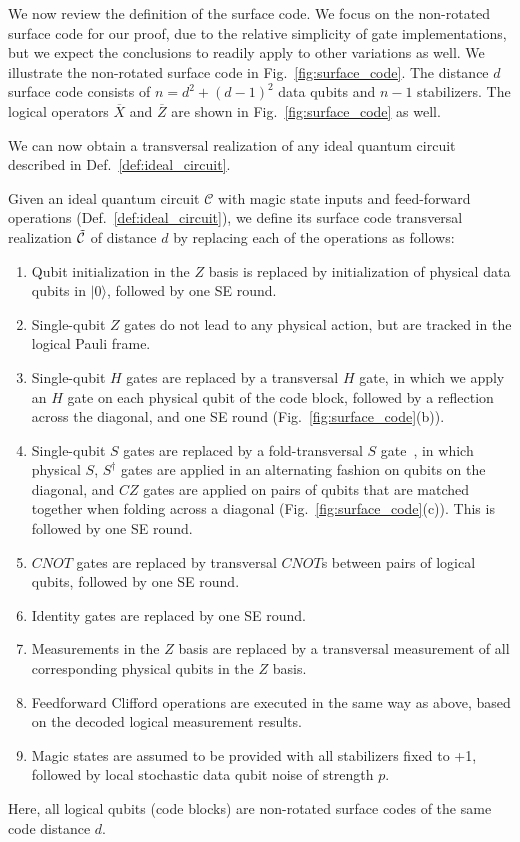 We now review the definition of the surface code.
%
We focus on the non-rotated surface code for our proof, due to the relative simplicity of gate implementations, but we expect the conclusions to readily apply to other variations as well.
%
We illustrate the non-rotated surface code in Fig.~\ref{fig:surface_code}.
%
The distance $d$ surface code consists of $n=d^2+(d-1)^2$ data qubits and $n-1$ stabilizers.
%
The logical operators $\overline{X}$ and $\overline{Z}$ are shown in Fig.~\ref{fig:surface_code} as well.

We can now obtain a transversal realization of any ideal quantum circuit described in Def.~\ref{def:ideal_circuit}.

\begin{definition}
\label{def:surface_code_circuit}
Given an ideal quantum circuit $\mathcal{C}$ with magic state inputs and feed-forward operations (Def.~\ref{def:ideal_circuit}), we define its surface code transversal realization $\tilde{\mathcal{C}}$ of distance $d$ by replacing each of the operations as follows:
\begin{enumerate}
\item Qubit initialization in the $Z$ basis is replaced by initialization of physical data qubits in $|0\rangle$, followed by one SE round.
\item Single-qubit $Z$ gates do not lead to any physical action, but are tracked in the logical Pauli frame.
\item Single-qubit $H$ gates are replaced by a transversal $H$ gate, in which we apply an $H$ gate on each physical qubit of the code block, followed by a reflection across the diagonal, and one SE round (Fig.~\ref{fig:surface_code}(b)).
\item Single-qubit $S$ gates are replaced by a fold-transversal $S$ gate~\cite{kubica2015unfolding,moussa2016transversal}, in which physical $S$, $S^\dagger$ gates are applied in an alternating fashion on qubits on the diagonal, and $CZ$ gates are applied on pairs of qubits that are matched together when folding across a diagonal (Fig.~\ref{fig:surface_code}(c)). This is followed by one SE round.
\item $CNOT$ gates are replaced by transversal $CNOT$s between pairs of logical qubits, followed by one SE round.
\item Identity gates are replaced by one SE round.
\item Measurements in the $Z$ basis are replaced by a transversal measurement of all corresponding physical qubits in the $Z$ basis.
\item Feedforward Clifford operations are executed in the same way as above, based on the decoded logical measurement results.
\item Magic states are assumed to be provided with all stabilizers fixed to +1, followed by local stochastic data qubit noise of strength $p$.
\end{enumerate}
Here, all logical qubits (code blocks) are non-rotated surface codes of the same code distance $d$.
\end{definition}

